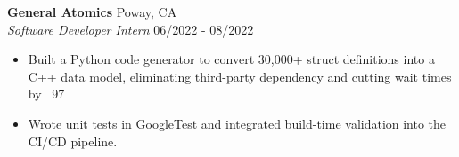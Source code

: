 
\textbf{General Atomics} \hfill Poway, CA \\
\textit{Software Developer Intern} \hfill 06/2022 - 08/2022
\begin{itemize}[leftmargin=*, nosep]
  \item Built a Python code generator to convert 30,000+ struct definitions into a C++ data model, eliminating third-party dependency and cutting wait times by ~97%
  \item Wrote unit tests in GoogleTest and integrated build-time validation into the CI/CD pipeline.
\end{itemize}
